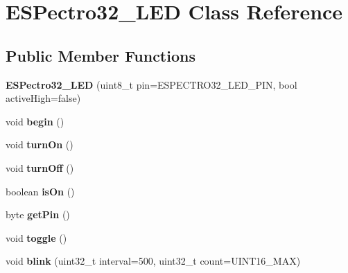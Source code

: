 \hypertarget{classESPectro32__LED}{\section{E\-S\-Pectro32\-\_\-\-L\-E\-D Class Reference}
\label{classESPectro32__LED}
}
\subsection*{Public Member Functions}
\begin{DoxyCompactItemize}
\item 
\hypertarget{classESPectro32__LED_a2ec872a607f649dc20fa1a27e8748c6e}{{\bfseries E\-S\-Pectro32\-\_\-\-L\-E\-D} (uint8\-\_\-t pin=E\-S\-P\-E\-C\-T\-R\-O32\-\_\-\-L\-E\-D\-\_\-\-P\-I\-N, bool active\-High=false)}\label{classESPectro32__LED_a2ec872a607f649dc20fa1a27e8748c6e}

\item 
\hypertarget{classESPectro32__LED_ae400b1bf234437f37b399f89030522de}{void {\bfseries begin} ()}\label{classESPectro32__LED_ae400b1bf234437f37b399f89030522de}

\item 
\hypertarget{classESPectro32__LED_a68ceeb515c2884acc105675f52911f7f}{void {\bfseries turn\-On} ()}\label{classESPectro32__LED_a68ceeb515c2884acc105675f52911f7f}

\item 
\hypertarget{classESPectro32__LED_ad71509be67aae18c83ecc5af0dd27bc2}{void {\bfseries turn\-Off} ()}\label{classESPectro32__LED_ad71509be67aae18c83ecc5af0dd27bc2}

\item 
\hypertarget{classESPectro32__LED_a81487185442edd657d83a9fb57c1e698}{boolean {\bfseries is\-On} ()}\label{classESPectro32__LED_a81487185442edd657d83a9fb57c1e698}

\item 
\hypertarget{classESPectro32__LED_aa6aed07ae9a12dde1d9a86df99ad69a6}{byte {\bfseries get\-Pin} ()}\label{classESPectro32__LED_aa6aed07ae9a12dde1d9a86df99ad69a6}

\item 
\hypertarget{classESPectro32__LED_a05d65ff5cb4d266061e1b330fee25f77}{void {\bfseries toggle} ()}\label{classESPectro32__LED_a05d65ff5cb4d266061e1b330fee25f77}

\item 
\hypertarget{classESPectro32__LED_a8099ac834f4763b94d91849d96b001d6}{void {\bfseries blink} (uint32\-\_\-t interval=500, uint32\-\_\-t count=U\-I\-N\-T16\-\_\-\-M\-A\-X)}\label{classESPectro32__LED_a8099ac834f4763b94d91849d96b001d6}


\end{DoxyCompactItemize}
